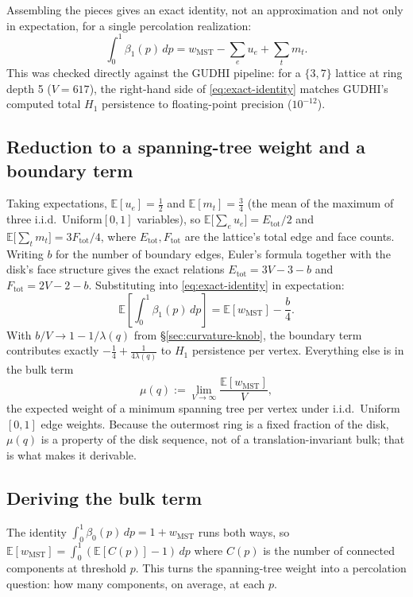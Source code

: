\documentclass[11pt]{article}
\begin{document}
Assembling the pieces gives an exact identity, not an approximation and not only in expectation, for a single percolation realization:
\begin{equation}
\int_0^1\beta_1(p)\,dp = w_{\mathrm{MST}} - \sum_e u_e + \sum_t m_t.
\label{eq:exact-identity}
\end{equation}
This was checked directly against the GUDHI pipeline: for a $\{3,7\}$ lattice at ring depth 5 ($V=617$), the right-hand side of \eqref{eq:exact-identity} matches GUDHI's computed total $H_1$ persistence to floating-point precision ($10^{-12}$).

\subsection{Reduction to a spanning-tree weight and a boundary term}
\label{sec:boundary}

Taking expectations, $\mathbb{E}[u_e]=\tfrac12$ and $\mathbb{E}[m_t]=\tfrac34$ (the mean of the maximum of three i.i.d.\ Uniform$[0,1]$ variables), so $\mathbb{E}\big[\sum_e u_e\big]=E_{\mathrm{tot}}/2$ and $\mathbb{E}\big[\sum_t m_t\big]=3F_{\mathrm{tot}}/4$, where $E_{\mathrm{tot}},F_{\mathrm{tot}}$ are the lattice's total edge and face counts. Writing $b$ for the number of boundary edges, Euler's formula together with the disk's face structure gives the exact relations $E_{\mathrm{tot}}=3V-3-b$ and $F_{\mathrm{tot}}=2V-2-b$. Substituting into \eqref{eq:exact-identity} in expectation:
\begin{equation}
\mathbb{E}\left[\int_0^1\beta_1(p)\,dp\right] = \mathbb{E}[w_{\mathrm{MST}}] - \frac{b}{4}.
\label{eq:reduced-identity}
\end{equation}
With $b/V\to1-1/\lambda(q)$ from \S\ref{sec:curvature-knob}, the boundary term contributes exactly $-\tfrac14+\tfrac{1}{4\lambda(q)}$ to $H_1$ persistence per vertex. Everything else is in the bulk term
\[
\mu(q) := \lim_{V\to\infty}\frac{\mathbb{E}[w_{\mathrm{MST}}]}{V},
\]
the expected weight of a minimum spanning tree per vertex under i.i.d.\ Uniform$[0,1]$ edge weights. Because the outermost ring is a fixed fraction of the disk, $\mu(q)$ is a property of the disk sequence, not of a translation-invariant bulk; that is what makes it derivable.

\subsection{Deriving the bulk term}
\label{sec:bulk}

The identity $\int_0^1\beta_0(p)\,dp=1+w_{\mathrm{MST}}$ runs both ways, so $\mathbb{E}[w_{\mathrm{MST}}]=\int_0^1(\mathbb{E}[C(p)]-1)\,dp$ where $C(p)$ is the number of connected components at threshold $p$. This turns the spanning-tree weight into a percolation question: how many components, on average, at each $p$.
\end{document}
